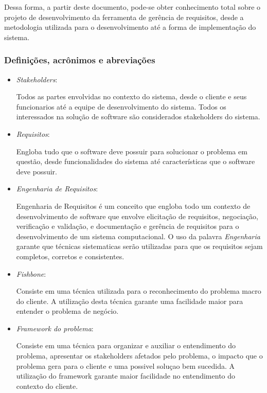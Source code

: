 Dessa forma, a partir deste documento, pode-se obter conhecimento total sobre o projeto de desenvolvimento da ferramenta de gerência de requisitos, desde a metodologia utilizada para o desenvolvimento até a forma de implementação do sistema.

\subsubsection{Definições, acrônimos e abreviações}

\begin{itemize}
	\item \textit{Stakeholders}:

		Todos as partes envolvidas no contexto do sistema, desde o cliente e seus funcionarios até a equipe de desenvolvimento do sistema. Todos os interessados na solução de software são considerados stakeholders do sistema.

	\item \textit{Requisitos}: 

		Engloba tudo que o software deve possuir para solucionar o problema em questão, desde funcionalidades do sistema até características que o software deve possuir.

	\item \textit{Engenharia de Requisitos}:

		Engenharia de Requisitos é um conceito que engloba todo um contexto de desenvolvimento de software que envolve elicitação de requisitos, negociação, verificação e validação, e documentação e gerência de requisitos para o desenvolvimento de um sistema computacional. O uso da palavra \textit{Engenharia} garante que técnicas sistematicas serão utilizadas para que os requisitos sejam completos, corretos e consistentes.

	\item \textit{Fishbone}:

		Consiste em uma técnica utilizada para o reconhecimento do problema macro do cliente. A utilização desta técnica garante uma facilidade maior para entender o problema de negócio.

	\item \textit{Framework do problema}:

		Consiste em uma técnica para organizar e auxiliar o entendimento do problema, apresentar os stakeholders afetados pelo problema, o impacto que o problema gera para o cliente e uma possivel soluçao bem sucedida. A utilização do framework garante maior facilidade no entendimento do contexto do cliente.


\end{itemize}
